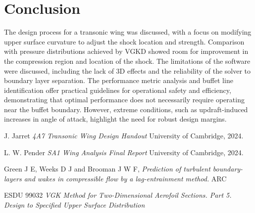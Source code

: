 \documentclass{article}
\begin{document}
\section{Conclusion}

The design process for a transonic wing was discussed, with a focus on modifying upper surface curvature to adjust the shock location and strength.
Comparison with pressure distributions achieved by VGKD showed room for improvement in the compression region and location of the shock.
The limitations of the software were discussed, including the lack of 3D effects and the reliability of the solver to boundary layer separation.
The performance metric analysis and buffet line identification offer practical guidelines for operational safety and efficiency, 
demonstrating that optimal performance does not necessarily require operating near the buffet boundary.
However, extreme conditions, such as updraft-induced increases in angle of attack, highlight the need for robust design margins.

\begin{thebibliography}{9}

      J. Jarret
      \emph{4A7 Transonic Wing Design Handout}
      University of Cambridge,
      2024.

      L. W. Pender
      \emph{SA1 Wing Analysis Final Report}
      University of Cambridge,
      2024.

      Green J E, Weeks D J and Brooman J W F,
      \emph{Prediction of turbulent boundary-layers and wakes in compressible flow by a lag-entrainment method.}
      ARC

      ESDU 99032
      \emph{VGK Method for Two-Dimensional Aerofoil Sections. Part 5. Design to Specified Upper Surface Distribution}
    
\end{thebibliography}
\end{document}
